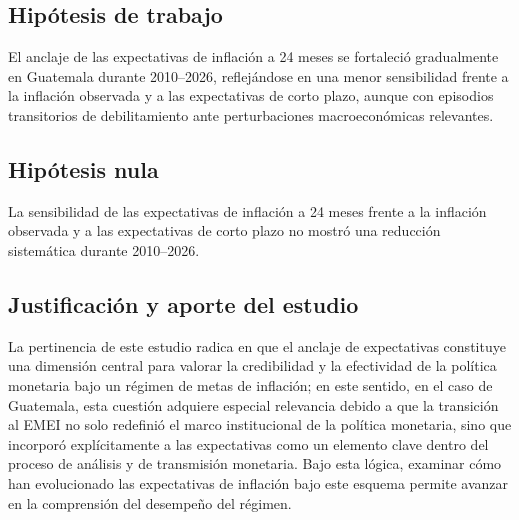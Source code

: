 \documentclass[
  10.5pt,
  letterpaper,
  twocolumn]{article}
\begin{document}
\subsection{Hipótesis de trabajo}\label{hipuxf3tesis-de-trabajo}

El anclaje de las expectativas de inflación a 24 meses se fortaleció
gradualmente en Guatemala durante 2010--2026, reflejándose en una menor
sensibilidad frente a la inflación observada y a las expectativas de
corto plazo, aunque con episodios transitorios de debilitamiento ante
perturbaciones macroeconómicas relevantes.

\subsection{Hipótesis nula}\label{hipuxf3tesis-nula}

La sensibilidad de las expectativas de inflación a 24 meses frente a la
inflación observada y a las expectativas de corto plazo no mostró una
reducción sistemática durante 2010--2026.

\subsection{Justificación y aporte del
estudio}\label{justificaciuxf3n-y-aporte-del-estudio}

La pertinencia de este estudio radica en que el anclaje de expectativas
constituye una dimensión central para valorar la credibilidad y la
efectividad de la política monetaria bajo un régimen de metas de
inflación; en este sentido, en el caso de Guatemala, esta cuestión
adquiere especial relevancia debido a que la transición al EMEI no solo
redefinió el marco institucional de la política monetaria, sino que
incorporó explícitamente a las expectativas como un elemento clave
dentro del proceso de análisis y de transmisión monetaria. Bajo esta
lógica, examinar cómo han evolucionado las expectativas de inflación
bajo este esquema permite avanzar en la comprensión del desempeño del
régimen.
\end{document}
